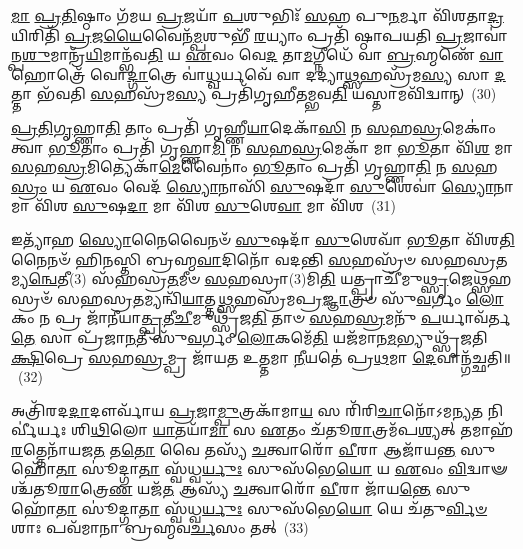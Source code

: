 \-\ul{𑌮𑌾} \ul{𑌪𑍍𑌰}\-\-\ul{𑌤𑌿}\-𑌷𑍍𑌠𑌾𑌂 𑌗᳴𑌮𑌯 \ul{𑌪𑍍𑌰}\-𑌜𑌯𑌾᳴ \ul{𑌪}\-𑌶𑍁𑌭𑌿𑌃᳴ \ul{𑌸}\-𑌹 𑌪𑍁\-\ul{𑌨}\-𑌰𑍍𑌮𑌾 𑌵𑌿᳴𑌶𑌤𑌾\-\ul{𑌦𑍍𑌰}\-𑌯𑌿𑌰𑌿𑌤𑌿᳴ \ul{𑌪𑍍𑌰}\-𑌜\-\ul{𑌯𑍈}\-𑌵𑍈𑌨᳴\-\ul{𑌮𑍍𑌪}\-𑌶𑍁𑌭𑍀᳴ \ul{𑌰}\-𑌯𑍍𑌯𑌾𑌂 𑌪𑍍𑌰𑌤𑌿᳴ 𑌷𑍍𑌠𑌾𑌪𑌯𑌤𑌿 \ul{𑌪𑍍𑌰}\-𑌜𑌾𑌵𑌾॑𑌨𑍍𑌪\-\ul{𑌶𑍁}\-𑌮𑌾𑌨𑍍𑌰᳴\-\ul{𑌯𑌿}\-𑌮𑌾𑌨𑍍𑌭᳴𑌵\-\ul{𑌤𑌿} 𑌯 \ul{𑌏}\-𑌵𑌂 𑌵𑍇\-\ul{𑌦} 𑌤𑌾\-\ul{𑌮}\-𑌗𑍍𑌨𑍀𑌧𑍇᳴ 𑌵𑌾 \ul{𑌬𑍍𑌰}\-𑌹𑍍𑌮𑌣𑍇᳴ \ul{𑌵𑌾} 𑌹𑍋𑌤𑍍𑌰𑍇᳴ 𑌵𑍋\-\ul{𑌦𑍍𑌗𑌾}\-𑌤𑍍𑌰𑍇 𑌵𑌾॑\-\ul{𑌧𑍍𑌵}\-𑌰𑍍𑌯𑌵𑍇᳴ 𑌵𑌾 𑌦𑌦𑍍𑌯𑌾\-\ul{𑌥𑍍𑌸}\-𑌹𑌸𑍍𑌰᳴𑌮\-\ul{𑌸𑍍𑌯} 𑌸𑌾 \ul{𑌦}\-𑌤𑍍𑌤𑌾 𑌭᳴𑌵𑌤𑌿 \ul{𑌸}\-𑌹𑌸𑍍𑌰᳴𑌮\-\ul{𑌸𑍍𑌯} 𑌪𑍍𑌰𑌤𑌿᳴𑌗𑍃𑌹𑍀𑌤𑌮𑍍𑌭𑌵\-\ul{𑌤𑌿} 𑌯𑌸𑍍𑌤𑌾𑌮𑌵𑌿᳴𑌦𑍍𑌵𑌾𑌨𑍍~(30)

\-\ul{𑌪𑍍𑌰}\-\-\ul{𑌤𑌿}\-\-\ul{𑌗𑍃}\-𑌹𑍍𑌣𑌾\-\ul{𑌤𑌿} 𑌤𑌾𑌂 𑌪𑍍𑌰𑌤𑌿᳴ 𑌗𑍃𑌹𑍍𑌣𑍀\-\ul{𑌯𑌾}\-𑌦𑍇𑌕𑌾᳴\-\ul{𑌸𑌿} 𑌨 \ul{𑌸}\-𑌹\-\ul{𑌸𑍍𑌰}\-𑌮𑍇𑌕𑌾𑌂॑ 𑌤𑍍𑌵𑌾 \ul{𑌭𑍂}\-𑌤𑌾𑌂 𑌪𑍍𑌰𑌤𑌿᳴ 𑌗𑍃𑌹𑍍𑌣𑌾\-\ul{𑌮𑌿} 𑌨 \ul{𑌸}\-𑌹\-\ul{𑌸𑍍𑌰}\-𑌮𑍇𑌕𑌾᳴ 𑌮𑌾 \ul{𑌭𑍂}\-𑌤𑌾 𑌵𑌿᳴\-\ul{𑌶} 𑌮𑌾 \ul{𑌸}\-𑌹\-\ul{𑌸𑍍𑌰}\-𑌮𑌿𑌤𑍍𑌯𑍇𑌕𑌾᳴\-\ul{𑌮𑍇}\-𑌵𑍈𑌨𑌾𑌂॑ \ul{𑌭𑍂}\-𑌤𑌾𑌂 𑌪𑍍𑌰𑌤𑌿᳴ 𑌗𑍃𑌹𑍍𑌣𑌾\-\ul{𑌤𑌿} 𑌨 \ul{𑌸}\-𑌹\-\ul{𑌸𑍍𑌰𑌂} 𑌯 \ul{𑌏}\-𑌵𑌂 𑌵𑍇𑌦᳴ \ul{𑌸𑍍𑌯𑍋}\-𑌨𑌾𑌸𑌿᳴ \ul{𑌸𑍁}\-𑌷𑌦𑌾᳴ \ul{𑌸𑍁}\-𑌶𑍇𑌵𑌾॑ \ul{𑌸𑍍𑌯𑍋}\-𑌨𑌾 𑌮𑌾 𑌵𑌿᳴𑌶 \ul{𑌸𑍁}\-𑌷\-\ul{𑌦𑌾} 𑌮𑌾 𑌵𑌿᳴𑌶 \ul{𑌸𑍁}\-𑌶𑍇\-\ul{𑌵𑌾} 𑌮𑌾 𑌵𑌿᳴𑌶~(31)

𑌇𑌤𑍍𑌯𑌾᳴𑌹 \ul{𑌸𑍍𑌯𑍋}\-𑌨𑍈𑌵𑍈𑌨𑍞᳴ \ul{𑌸𑍁}\-𑌷𑌦𑌾᳴ \ul{𑌸𑍁}\-𑌶𑍇𑌵𑌾᳴ \ul{𑌭𑍂}\-𑌤𑌾 𑌵𑌿᳴𑌶\-\ul{𑌤𑌿} 𑌨𑍈𑌨𑍞᳴ 𑌹𑌿𑌨𑌸𑍍𑌤𑌿 𑌬𑍍𑌰𑌹𑍍𑌮\-\ul{𑌵𑌾}\-𑌦𑌿𑌨𑍋᳴ 𑌵𑌦𑌨𑍍𑌤𑌿 \ul{𑌸}\-𑌹𑌸𑍍𑌰᳴𑍞 𑌸𑌹𑌸𑍍𑌰\-\ul{𑌤}\-𑌮𑍍𑌯\-\ul{𑌨𑍍𑌵𑍇}\-𑌤𑍀(3) 𑌸᳴𑌹𑌸𑍍𑌰\-\ul{𑌤}\-𑌮𑍀𑍞 \ul{𑌸}\-𑌹𑌸𑍍𑌰𑌾(3)𑌮𑌿\-\ul{𑌤𑌿} 𑌯𑌤𑍍𑌪𑍍𑌰𑌾𑌚𑍀᳴𑌮𑍁\-\ul{𑌥𑍍𑌸𑍃}\-𑌜𑍇\-\ul{𑌥𑍍𑌸}\-𑌹𑌸𑍍𑌰𑍞᳴ 𑌸𑌹𑌸𑍍𑌰\-\ul{𑌤}\-𑌮𑍍𑌯𑌨𑍍𑌵𑌿᳴\-\ul{𑌯𑌾}\-𑌤𑍍𑌤\-\ul{𑌥𑍍𑌸}\-𑌹𑌸𑍍𑌰᳴𑌮𑌪𑍍𑌰\-\ul{𑌜𑍍𑌞𑌾}\-𑌤𑍍𑌰𑍞 𑌸𑍁᳴\-\ul{𑌵}\-𑌰𑍍𑌗𑌂 \ul{𑌲𑍋}\-𑌕𑌂 𑌨 𑌪𑍍𑌰 𑌜𑌾᳴𑌨𑍀𑌯𑌾\-\ul{𑌤𑍍𑌪𑍍𑌰}\-𑌤𑍀\-\ul{𑌚𑍀}\-𑌮𑍁𑌥𑍍𑌸𑍃᳴𑌜\-\ul{𑌤𑌿} 𑌤𑌾𑍞 \ul{𑌸}\-𑌹\-\ul{𑌸𑍍𑌰}\-𑌮𑌨𑍁᳴ \ul{𑌪}\-𑌰𑍍𑌯𑌾𑌵᳴𑌰𑍍𑌤\-\ul{𑌤𑍇} 𑌸𑌾 𑌪𑍍𑌰᳴𑌜𑌾\-\ul{𑌨}\-𑌤𑍀 𑌸𑍁᳴\-\ul{𑌵}\-𑌰𑍍𑌗𑌂 \ul{𑌲𑍋}\-𑌕𑌮𑍇᳴\-\ul{𑌤𑌿} 𑌯𑌜᳴𑌮𑌾𑌨\-\ul{𑌮}\-𑌭𑍍𑌯𑍁𑌥𑍍𑌸𑍃᳴𑌜𑌤𑌿 \ul{𑌕𑍍𑌷𑌿}\-𑌪𑍍𑌰𑍇 \ul{𑌸}\-𑌹\-\ul{𑌸𑍍𑌰}\-𑌮𑍍𑌪𑍍𑌰 𑌜𑌾᳴𑌯𑌤 𑌉\-\ul{𑌤𑍍𑌤}\-𑌮𑌾 \ul{𑌨𑍀}\-𑌯𑌤𑍇॑ 𑌪𑍍𑌰\-\ul{𑌥}\-𑌮𑌾 \ul{𑌦𑍇}\-𑌵𑌾𑌨𑍍𑌗᳴𑌚𑍍𑌛𑌤𑌿॥~(32)

{\anuvakamend[{\-\ul{𑌲𑍋}\-𑌕𑌾𑌨𑍍𑌗᳴𑌮𑌯\-\ul{𑌤𑌿} 𑌸𑌾𑌵𑌿᳴𑌦𑍍𑌵𑌾\-\ul{𑌨𑍍𑌥𑍍𑌸𑍁}\-𑌶𑍇\-\ul{𑌵𑌾} 𑌮𑌾𑌵𑌿᳴\-\ul{𑌶} 𑌯𑌜᳴𑌮𑌾\-\ul{𑌨𑌂} 𑌦𑍍𑌵𑌾𑌦᳴𑌶 𑌚}]}%

𑌅𑌤𑍍𑌰𑌿᳴𑌰𑌦\-\ul{𑌦𑌾}\-𑌦𑍗𑌰𑍍𑌵𑌾᳴𑌯 \ul{𑌪𑍍𑌰}\-𑌜𑌾\-\ul{𑌮𑍍𑌪𑍁}\-𑌤𑍍𑌰𑌕𑌾᳴𑌮𑌾\-\ul{𑌯} 𑌸 𑌰𑌿᳴𑌰𑌿\-\ul{𑌚𑌾}\-𑌨𑍋᳴\-𑌽𑌮𑌨𑍍𑌯\-\ul{𑌤} 𑌨𑌿𑌰𑍍𑌵𑍀॑𑌰𑍍𑌯𑌃 𑌶𑌿\-\ul{𑌥𑌿}\-𑌲𑍋 \ul{𑌯𑌾}\-𑌤𑌯𑌾᳴\-\ul{𑌮𑌾} 𑌸 \ul{𑌏}\-𑌤𑌂 𑌚᳴𑌤𑍂\-\ul{𑌰𑌾}\-𑌤𑍍𑌰𑌮᳴𑌪\-\ul{𑌶𑍍𑌯}\-𑌤𑍍 𑌤𑌮𑌾𑌹᳴\-\ul{𑌰}\-𑌤𑍍𑌤𑍇𑌨𑌾᳴𑌯𑌜\-\ul{𑌤} 𑌤\-\ul{𑌤𑍋} 𑌵𑍈 𑌤𑌸𑍍𑌯᳴ \ul{𑌚}\-𑌤𑍍𑌵𑌾𑌰𑍋᳴ \ul{𑌵𑍀}\-𑌰𑌾 𑌆𑌜𑌾᳴𑌯\-\ul{𑌨𑍍𑌤} 𑌸𑍁𑌹𑍋᳴\-\ul{𑌤𑌾} 𑌸𑍂॑𑌦𑍍𑌗𑌾\-\ul{𑌤𑌾} 𑌸𑍍𑌵᳴𑌧𑍍𑌵\-\ul{𑌰𑍍𑌯𑍁𑌃} 𑌸𑍁𑌸᳴𑌭𑍇\-\ul{𑌯𑍋} 𑌯 \ul{𑌏}\-𑌵𑌂 \ul{𑌵𑌿}\-𑌦𑍍𑌵𑌾𑍟𑌶𑍍𑌚᳴𑌤𑍂\-\ul{𑌰𑌾}\-𑌤𑍍𑌰𑍇\-\ul{𑌣} 𑌯𑌜᳴\-\ul{𑌤} 𑌆𑌸𑍍𑌯᳴ \ul{𑌚}\-𑌤𑍍𑌵𑌾𑌰𑍋᳴ \ul{𑌵𑍀}\-𑌰𑌾 𑌜𑌾᳴𑌯\-\ul{𑌨𑍍𑌤𑍇} 𑌸𑍁𑌹𑍋᳴\-\ul{𑌤𑌾} 𑌸𑍂॑𑌦𑍍𑌗𑌾\-\ul{𑌤𑌾} 𑌸𑍍𑌵᳴𑌧𑍍𑌵\-\ul{𑌰𑍍𑌯𑍁𑌃} 𑌸𑍁𑌸᳴𑌭𑍇\-\ul{𑌯𑍋} 𑌯𑍇 𑌚᳴𑌤𑍁\-\ul{𑌰𑍍𑌵𑌿}\-\-\ul{𑍞}\-𑌶𑌾𑌃 𑌪𑌵᳴𑌮𑌾𑌨𑌾 𑌬𑍍𑌰𑌹𑍍𑌮𑌵\-\ul{𑌰𑍍𑌚}\-𑌸𑌂 𑌤𑌤𑍍~(33)

